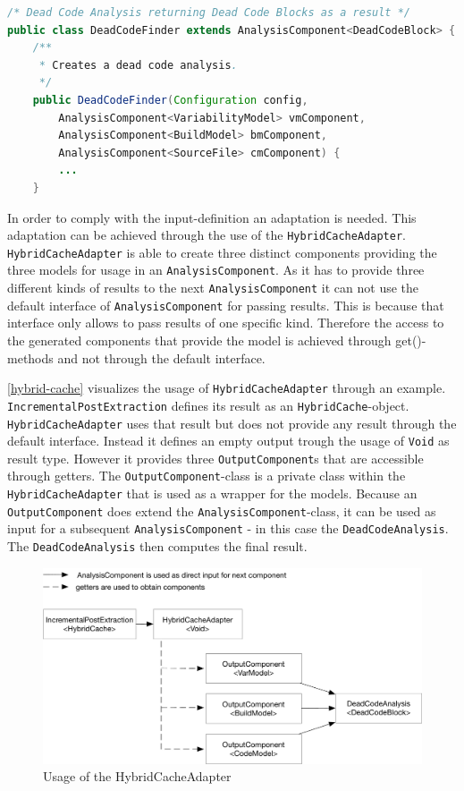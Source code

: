 \documentclass[a4paper]{article}
\begin{document}
\begin{lstlisting}[language=java]
/* Dead Code Analysis returning Dead Code Blocks as a result */
public class DeadCodeFinder extends AnalysisComponent<DeadCodeBlock> {
    /**
     * Creates a dead code analysis.
     */
    public DeadCodeFinder(Configuration config, 
        AnalysisComponent<VariabilityModel> vmComponent, 
        AnalysisComponent<BuildModel> bmComponent, 
        AnalysisComponent<SourceFile> cmComponent) {
        ...
    }
\end{lstlisting}

In order to comply with the input-definition an adaptation is needed. This adaptation can be achieved through the use of the \texttt{HybridCacheAdapter}. \texttt{HybridCacheAdapter} is able to create three distinct components providing the three models for usage in an \texttt{AnalysisComponent}. As it has to provide three different kinds of results to the next \texttt{AnalysisComponent} it can not use the default interface of \texttt{AnalysisComponent} for passing results. This is because that interface only allows to pass results of one specific kind. Therefore the access to the generated components that provide the model is achieved through get()-methods and not through the default interface. 

\autoref{hybrid-cache} visualizes the usage of \texttt{HybridCacheAdapter} through an example. \texttt{IncrementalPostExtraction} defines its result as an \texttt{HybridCache}-object. \texttt{HybridCacheAdapter} uses that result but does not provide any result through the default interface. Instead it defines an empty output trough the usage of \texttt{Void} as result type. However it provides three \texttt{OutputComponent}s that are accessible through getters. The \texttt{OutputComponent}-class is a private class within the \texttt{HybridCacheAdapter} that is used as a wrapper for the models. Because an \texttt{OutputComponent} does extend the \texttt{AnalysisComponent}-class, it can be used as input for a subsequent \texttt{AnalysisComponent} - in this case the \texttt{DeadCodeAnalysis}. The \texttt{DeadCodeAnalysis} then computes the final result.

\begin{figure}[h] 
  \centering
  \begin{minipage}[b]{1\textwidth} 
    \caption[Usage of the HybridCacheAdapter]{Usage of the HybridCacheAdapter}\label{hybrid-cache}
    \includegraphics[width=1\textwidth]{img/HybridCacheAdapter.pdf}
  \end{minipage}
\end{figure}
\end{document}

